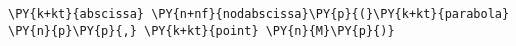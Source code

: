\begin{Verbatim}[commandchars=\\\{\}]
      \PY{k+kt}{abscissa} \PY{n+nf}{nodabscissa}\PY{p}{(}\PY{k+kt}{parabola} \PY{n}{p}\PY{p}{,} \PY{k+kt}{point} \PY{n}{M}\PY{p}{)}
\end{Verbatim}

